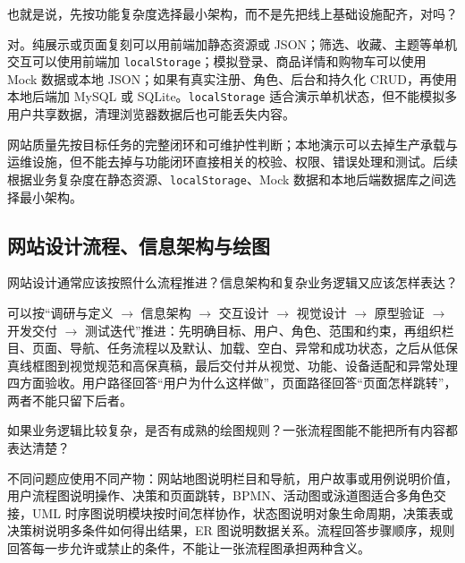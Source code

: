 \documentclass[UTF8,a4paper,11pt]{ctexart}
\begin{document}
\begin{membermsg}
也就是说，先按功能复杂度选择最小架构，而不是先把线上基础设施配齐，对吗？
\end{membermsg}

\begin{gptmsg}
对。纯展示或页面复刻可以用前端加静态资源或 JSON；筛选、收藏、主题等单机交互可以使用前端加 \texttt{localStorage}；模拟登录、商品详情和购物车可以使用 Mock 数据或本地 JSON；如果有真实注册、角色、后台和持久化 CRUD，再使用本地后端加 MySQL 或 SQLite。\texttt{localStorage} 适合演示单机状态，但不能模拟多用户共享数据，清理浏览器数据后也可能丢失内容。
\end{gptmsg}

\begin{decisionbox}
网站质量先按目标任务的完整闭环和可维护性判断；本地演示可以去掉生产承载与运维设施，但不能去掉与功能闭环直接相关的校验、权限、错误处理和测试。后续根据业务复杂度在静态资源、\texttt{localStorage}、Mock 数据和本地后端数据库之间选择最小架构。
\end{decisionbox}

\subsection{网站设计流程、信息架构与绘图}

\begin{membermsg}
网站设计通常应该按照什么流程推进？信息架构和复杂业务逻辑又应该怎样表达？
\end{membermsg}

\begin{gptmsg}
可以按“调研与定义 $\rightarrow$ 信息架构 $\rightarrow$ 交互设计 $\rightarrow$ 视觉设计 $\rightarrow$ 原型验证 $\rightarrow$ 开发交付 $\rightarrow$ 测试迭代”推进：先明确目标、用户、角色、范围和约束，再组织栏目、页面、导航、任务流程以及默认、加载、空白、异常和成功状态，之后从低保真线框图到视觉规范和高保真稿，最后交付并从视觉、功能、设备适配和异常处理四方面验收。用户路径回答“用户为什么这样做”，页面路径回答“页面怎样跳转”，两者不能只留下后者。
\end{gptmsg}

\begin{membermsg}
如果业务逻辑比较复杂，是否有成熟的绘图规则？一张流程图能不能把所有内容都表达清楚？
\end{membermsg}

\begin{gptmsg}
不同问题应使用不同产物：网站地图说明栏目和导航，用户故事或用例说明价值，用户流程图说明操作、决策和页面跳转，BPMN、活动图或泳道图适合多角色交接，UML 时序图说明模块按时间怎样协作，状态图说明对象生命周期，决策表或决策树说明多条件如何得出结果，ER 图说明数据关系。流程回答步骤顺序，规则回答每一步允许或禁止的条件，不能让一张流程图承担两种含义。
\end{gptmsg}
\end{document}
